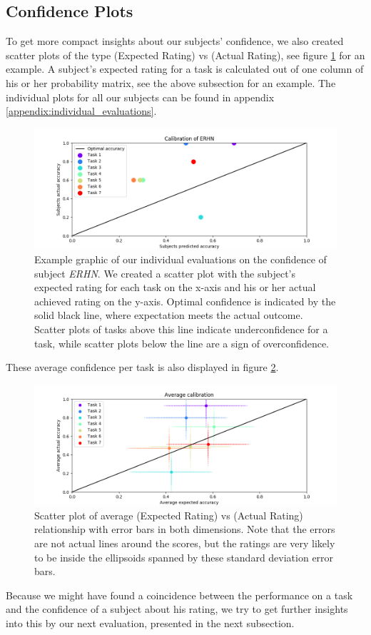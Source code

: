\documentclass[../main/main.tex]{subfiles}
\begin{document}
\subsection{Confidence Plots}
To get more compact insights about our subjects' confidence, we also created scatter plots of the type (Expected Rating) vs (Actual Rating), see figure \ref{fig:erhn_confidence} for an example. A subject's expected rating for a task is calculated out of one column of his or her probability matrix, see the above subsection for an example. The individual plots for all our subjects can be found in appendix \ref{appendix:individual_evaluations}.
\begin{figure}[h]
	\centering
	\captionsetup{justification=centering}
	\includegraphics[width=\textwidth]{../assets/ERHN_calibration.png}
	\caption{Example graphic of our individual evaluations on the confidence of subject \textit{ERHN}. We created a scatter plot with the subject's expected rating for each task on the x-axis and his or her actual achieved rating on the y-axis. Optimal confidence is indicated by the solid black line, where expectation meets the actual outcome. Scatter plots of tasks above this line indicate underconfidence for a task, while scatter plots below the line are a sign of overconfidence.}
	\label{fig:erhn_confidence} 
\end{figure}
These average confidence per task is also displayed in figure \ref{fig:avg_confidence}.
\begin{figure}[h]
	\centering
	\captionsetup{justification=centering}
	\includegraphics[width=\textwidth]{../assets/average_calibration.png}
	\caption{Scatter plot of average (Expected Rating) vs (Actual Rating) relationship with error bars in both dimensions. Note that the errors are not actual lines around the scores, but the ratings are very likely to be inside the ellipsoids spanned by these standard deviation error bars.}
	\label{fig:avg_confidence} 
\end{figure}
Because we might have found a coincidence between the performance on a task and the confidence of a subject about his rating, we try to get further insights into this by our next evaluation, presented in the next subsection.
\end{document}
